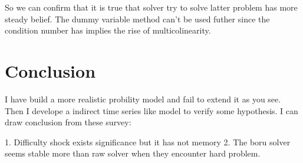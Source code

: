 \documentclass{article}
\begin{document}
So we can confirm that it is true that solver try to solve latter problem has more steady belief.
The dummy variable method can't be used futher since the condition number has implies the rise of multicolinearity.
 

\section{Conclusion}

I have build a more realistic probility model and fail to extend it as you see. 
Then I develope a indirect time series like model to verify some hypothesis. I can draw conclusion from these survey:

1. Difficulty shock exists significance but it has not memory 
2. The boru solver seems stable more than raw solver when they encounter hard problem.
\end{document}
